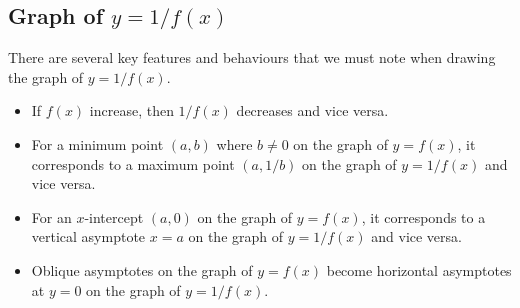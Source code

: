 \subsection{Graph of \texorpdfstring{$y = 1/f(x)$}{y = 1/f(x)}}

There are several key features and behaviours that we must note when drawing the graph of $y = 1/f(x)$.

\begin{itemize}
    \item If $f(x)$ increase, then $1/f(x)$ decreases and vice versa.
    \item For a minimum point $(a,b)$ where $b \neq 0$ on the graph of $y = f(x)$, it corresponds to a maximum point $(a, 1/b)$ on the graph of $y = 1/f(x)$ and vice versa.
    \item For an $x$-intercept $(a, 0)$ on the graph of $y = f(x)$, it corresponds to a vertical asymptote $x = a$ on the graph of $y = 1/f(x)$ and vice versa.
    \item Oblique asymptotes on the graph of $y = f(x)$ become horizontal asymptotes at $y = 0$ on the graph of $y = 1/f(x)$.
\end{itemize}

